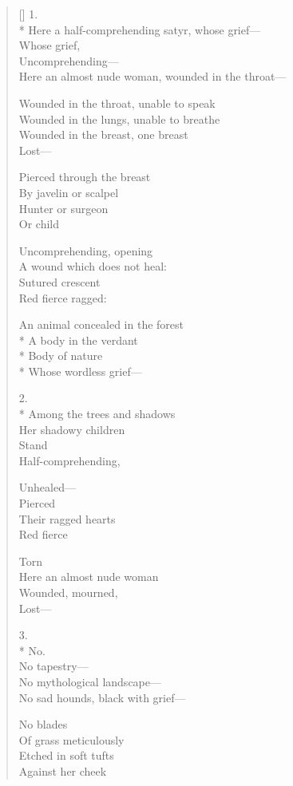\begin{verse}[\versewidth]
1.\\*
Here a half-comprehending satyr, whose grief---\\
Whose grief,\\
Uncomprehending---\\
Here an almost nude woman, wounded in the throat---

Wounded in the throat, unable to speak\\
Wounded in the lungs, unable to breathe\\
Wounded in the breast, one breast\\
Lost---

Pierced through the breast\\
By javelin or scalpel\\
Hunter or surgeon\\
Or child

Uncomprehending, opening\\
A wound which does not heal:\\
Sutured crescent\\
Red \quad fierce \quad ragged:

An animal concealed in the forest\\*
A body in the verdant\\*
Body of nature\\*
Whose wordless grief---

2.\\*
Among the trees and shadows\\
Her shadowy children\\
Stand\\
Half-comprehending,

Unhealed---\\
Pierced\\
Their ragged hearts\\
Red \quad fierce

Torn\\
Here an almost nude woman\\
Wounded, mourned, \\
Lost---

3.\\*
No.\\
No tapestry---\\
No mythological landscape---\\
No sad hounds, black with grief---

No blades\\
Of grass meticulously\\
Etched in soft tufts \\
Against her cheek


\end{verse}
